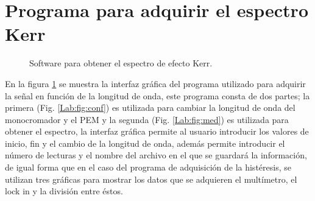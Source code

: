 \section{Programa para adquirir el espectro Kerr}
  
\begin{figure}[!hbt]
	\centering
    \caption[Interfaz gr\'afica del software utilizado para obtener el espectro de efecto Kerr.]{Software para obtener el espectro de efecto Kerr.}
    \label{Lab:fig:esp}
\end{figure}
En la figura \ref{Lab:fig:esp} se muestra la interfaz gr\'afica del programa utilizado para adquirir la se\~nal en funci\'on de la longitud de onda, este programa consta de dos partes; la primera  (Fig. \ref{Lab:fig:conf}) es utilizada para cambiar la longitud de onda del monocromador  y el PEM y la segunda (Fig. \ref{Lab:fig:med}) es utilizada para obtener el espectro, la interfaz gr\'afica permite al usuario introducir los valores de inicio, fin y el cambio de la longitud de onda, adem\'as permite introducir el n\'umero de lecturas y el nombre del  archivo en el que se guardar\'a la informaci\'on, de igual forma que en el caso del programa de adquisici\'on de la hist\'eresis, se utilizan tres gr\'aficas para mostrar los datos que se adquieren el mult\'imetro, el lock in y la divisi\'on entre \'estos.
\endinput